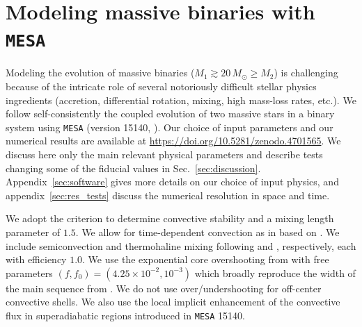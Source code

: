 \documentclass[twocolumn,twocolappendix,trackchanges]{aastex63}
\DeclareRobustCommand{\Secref}[1]{Sec.~\ref{#1}}
\begin{document}
\section{Modeling massive binaries with \texttt{MESA}}
\label{sec:methods}

Modeling the evolution of massive binaries
($M_1\gtrsim 20\,M_\odot \geq M_2$) is challenging because of the
intricate role of several notoriously difficult stellar physics
ingredients (accretion, differential rotation, mixing, high mass-loss
rates, etc.). We follow self-consistently the coupled evolution
of two massive stars in a binary system using \texttt{MESA} (version
15140, \citealt{paxton:11, paxton:13, paxton:15, paxton:18,
  paxton:19}). Our choice of input parameters and our numerical
results are available at \url{https://doi.org/10.5281/zenodo.4701565}. We discuss here
only the main relevant physical parameters and describe tests changing
some of the fiducial values in
\Secref{sec:discussion}. Appendix~\ref{sec:software} gives more
details on our choice of input physics, and
appendix~\ref{sec:res_tests} discuss the numerical resolution in space
and time.

We adopt the \cite{ledoux:47} criterion to determine convective
stability and a mixing length parameter of $1.5$. We allow for
time-dependent convection as in \cite{renzo:20:ppi_conv} based on
\cite{arnett:69}. We include semiconvection and thermohaline mixing
following \cite{langer:83} and \cite{kippenhahn:80}, respectively,
each with efficiency $1.0$. We use the exponential core overshooting
from \cite{herwig:00} with free parameters
$(f, f_0)=(4.25\times10^{-2}, 10^{-3})$ \citep{claret:17} which
broadly reproduce the width of the main sequence from
\cite{brott:11}. We do not use over/undershooting for off-center
convective shells. We also use the local implicit enhancement of the
convective flux in superadiabatic regions introduced
in \texttt{MESA} 15140.
\end{document}
